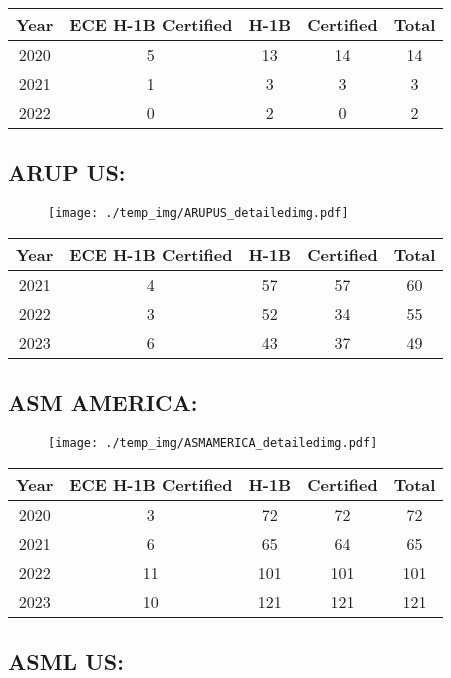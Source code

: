 \documentclass{article}%
\begin{document}
%
\begin{longtable}{c|c|c|c|c}%
\hline%
Year&ECE H{-}1B Certified&H{-}1B&Certified&Total\\%
\hline%
2020&5&13&14&14\\%
\hline%
2021&1&3&3&3\\%
\hline%
2022&0&2&0&2\\%
\hline%
\end{longtable}

%
\newpage%
\subsection{ARUP US:}%
\label{subsec:ARUPUS}%
\label{ARUPUSdetailed}%


\begin{figure}[htbp]%
\centering%
\texttt{[image: ./temp\_img/ARUPUS\_detailedimg.pdf]}%
\end{figure}

%
\begin{longtable}{c|c|c|c|c}%
\hline%
Year&ECE H{-}1B Certified&H{-}1B&Certified&Total\\%
\hline%
2021&4&57&57&60\\%
\hline%
2022&3&52&34&55\\%
\hline%
2023&6&43&37&49\\%
\hline%
\end{longtable}

%
\newpage%
\subsection{ASM AMERICA:}%
\label{subsec:ASMAMERICA}%
\label{ASMAMERICAdetailed}%


\begin{figure}[htbp]%
\centering%
\texttt{[image: ./temp\_img/ASMAMERICA\_detailedimg.pdf]}%
\end{figure}

%
\begin{longtable}{c|c|c|c|c}%
\hline%
Year&ECE H{-}1B Certified&H{-}1B&Certified&Total\\%
\hline%
2020&3&72&72&72\\%
\hline%
2021&6&65&64&65\\%
\hline%
2022&11&101&101&101\\%
\hline%
2023&10&121&121&121\\%
\hline%
\end{longtable}

%
\newpage%
\subsection{ASML US:}%
\label{subsec:ASMLUS}%
\label{ASMLUSdetailed}%
\end{document}
